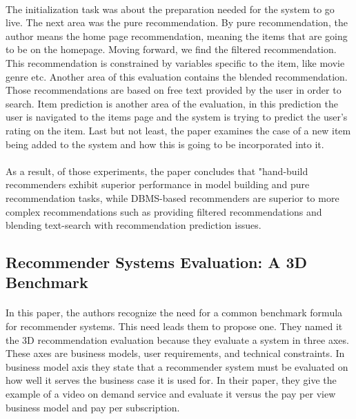 \paragraph{}The initialization task was about the preparation needed for the system to go live. The next area was the pure recommendation. By pure recommendation, the author means the home page recommendation, meaning the items that are going to be on the homepage. Moving forward, we find the filtered recommendation. This recommendation is constrained by variables specific to the item, like movie genre etc. Another area of this evaluation contains the blended recommendation. Those recommendations are based on free text provided by the user in order to search. Item prediction is another area of the evaluation, in this prediction the user is navigated to the items page and the system is trying to predict the user's rating on the item. Last but not least, the paper examines the case of a new item being added to the system and how this is going to be incorporated into it.

\paragraph{}As a result, of those experiments, the paper concludes that "hand-build recommenders exhibit superior performance in model building and pure recommendation tasks, while DBMS-based recommenders are superior to more complex recommendations such as providing filtered recommendations and blending text-search with recommendation prediction issues.

\subsection{Recommender Systems Evaluation: A 3D Benchmark \cite{said2012recommender}}
\paragraph{}In this paper, the authors recognize the need for a common benchmark formula for recommender systems. This need leads them to propose one. They named it the 3D recommendation evaluation because they evaluate a system in three axes. These axes are business models, user requirements, and technical constraints. In business model axis they state that a recommender system must be evaluated on how well it serves the business case it is used for. In their paper, they give the example of a video on demand service and evaluate it versus the pay per view business model and pay per subscription.

